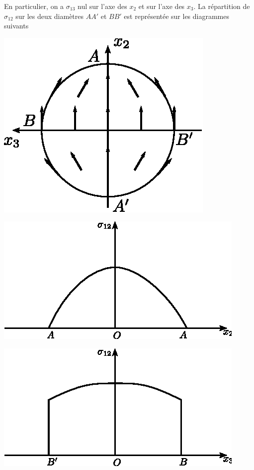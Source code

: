 \begin{multicols}{2}
    En particulier, on a $\sigma_{13}$ nul sur l'axe des $x_2$ et sur l'axe des $x_3$.
    La répartition de $\sigma_{12}$ sur les deux diamètres $AA'$ et $BB'$ est représentée sur les diagrammes suivants
    \columnbreak
    \begin{center}
        \includegraphics{../images/T1_Ch07-22}
    \end{center}
\end{multicols}
\begin{multicols}{2}
    \begin{center}
        \includegraphics{../images/T1_Ch07-23a}
    \end{center}
    \columnbreak
    \begin{center}
        \includegraphics{../images/T1_Ch07-23b}
    \end{center}
\end{multicols}
